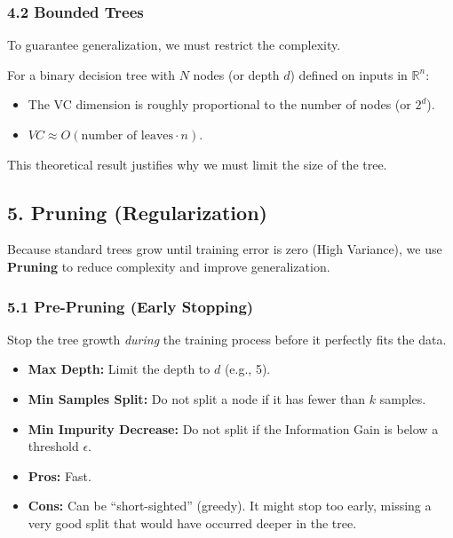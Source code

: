 \documentclass[
  italian,
  11pt,
]{article}
\begin{document}
\subsubsection{4.2 Bounded Trees}\label{bounded-trees}

To guarantee generalization, we must restrict the complexity.

For a binary decision tree with \(N\) nodes (or depth \(d\)) defined on
inputs in \(\mathbb{R}^n\):

\begin{itemize}
\item
  The VC dimension is roughly proportional to the number of nodes (or
  \(2^d\)).
\item
  \(VC \approx O(\text{number of leaves} \cdot n)\).
\end{itemize}

This theoretical result justifies why we must limit the size of the
tree.

\subsection{5. Pruning (Regularization)}\label{pruning-regularization}

Because standard trees grow until training error is zero (High
Variance), we use \textbf{Pruning} to reduce complexity and improve
generalization.

\subsubsection{5.1 Pre-Pruning (Early
Stopping)}\label{pre-pruning-early-stopping}

Stop the tree growth \emph{during} the training process before it
perfectly fits the data.

\begin{itemize}
\item
  \textbf{Max Depth:} Limit the depth to \(d\) (e.g., 5).
\item
  \textbf{Min Samples Split:} Do not split a node if it has fewer than
  \(k\) samples.
\item
  \textbf{Min Impurity Decrease:} Do not split if the Information Gain
  is below a threshold \(\epsilon\).
\item
  \textbf{Pros:} Fast.
\item
  \textbf{Cons:} Can be ``short-sighted'' (greedy). It might stop too
  early, missing a very good split that would have occurred deeper in
  the tree.
\end{itemize}
\end{document}
